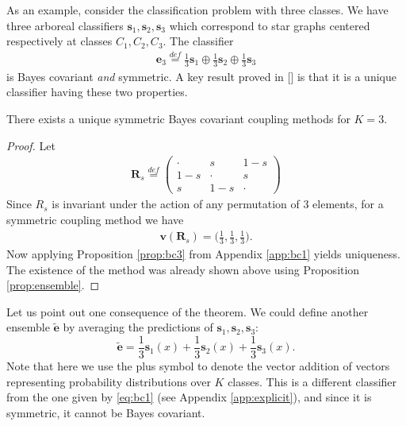 As an example, consider the classification problem with three classes. We have three arboreal classifiers $\boldsymbol{s}_1, \boldsymbol{s}_2, \boldsymbol{s}_3$ which correspond to star graphs centered respectively at classes $C_1, C_2, C_3$. The classifier 
\begin{align}
\boldsymbol{e}_3 \stackrel{def}{=} \frac13 \boldsymbol{s}_1 \oplus \frac13 \boldsymbol{s}_2 \oplus \frac 13 \boldsymbol{s}_3  \label{eq:bc1}
\end{align}
is Bayes covariant \emph{and} symmetric. A key result proved in [\cite{vsuch2016bayes}] is that it is a unique  classifier having these two properties.

\begin{thm} \label{thm:K3}
	There exists a unique symmetric Bayes covariant coupling methods for $K=3$.
\end{thm}

\begin{proof}
Let 
\begin{align}
	\boldsymbol{R}_s \stackrel{def}{=} \begin{pmatrix} \cdot & s & 1 -s \\  1-s & \cdot & s \\ s & 1-s & \cdot \end{pmatrix}
\end{align}
Since $R_s$ is invariant under the action of any permutation of 3 elements, 
for a symmetric coupling method we have 
\begin{align}
	\boldsymbol{v} (\boldsymbol{R}_s) = \biggl(\frac 13, \frac 13, \frac 13 \biggr).
\end{align}
Now applying  Proposition \ref{prop:bc3} from Appendix \ref{app:bc1} yields uniqueness. The existence of the method was already shown above using Proposition \ref{prop:ensemble}.
\end{proof}


Let us point out one consequence of the theorem. We could define another ensemble $\tilde{\boldsymbol{e}}$ by averaging the predictions of $\boldsymbol{s}_1, \boldsymbol{s}_2, \boldsymbol{s}_3$:
\[
\tilde{\boldsymbol{e}} = \frac13 \boldsymbol{s}_1(x) + \frac13 \boldsymbol{s}_2(x) + \frac 13 \boldsymbol{s}_3(x).
\]
Note that here we use the plus symbol to denote the vector addition of vectors representing  probability distributions over $K$ classes. This is a different classifier from the one given by  \eqref{eq:bc1} (see Appendix \ref{app:explicit}), and since it is symmetric, it cannot be Bayes covariant.

